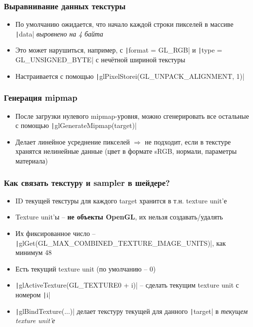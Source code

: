 \documentclass[10pt]{beamer}
\begin{document}
\begin{frame}[fragile]
\frametitle{Выравнивание данных текстуры}
\begin{itemize}
\item По умолчанию ожидается, что начало каждой строки пикселей в массиве \texttt|data| \textit{выровнено на 4 байта}
\pause
\item Это может нарушиться, например, с \texttt|format = GL_RGB| и \texttt|type = GL_UNSIGNED_BYTE| с нечётной шириной текстуры
\pause
\item Настраивается с помощью \texttt|glPixelStorei(GL_UNPACK_ALIGNMENT, 1)|
\end{itemize}
\end{frame}

\begin{frame}[fragile]
\frametitle{Генерация mipmap}
\begin{itemize}
\item После загрузки нулевого mipmap-уровня, можно сгенерировать все остальные с помощью \texttt|glGenerateMipmap(target)|
\pause
\item Делает линейное усреднение пикселей \begin{math}\Longrightarrow\end{math} не подходит, если в текстуре хранятся нелинейные данные (цвет в формате sRGB, нормали, параметры материала)
\end{itemize}
\end{frame}

\begin{frame}[fragile]
\frametitle{Как связать текстуру и sampler в шейдере?}
\begin{itemize}
\item ID текущей текстуры для каждого target хранится в т.н. texture unit'е
\item Texture unit'ы -- \textbf{не объекты OpenGL}, их нельзя создавать/удалять
\item Их фиксированное число -- \texttt|glGet(GL_MAX_COMBINED_TEXTURE_IMAGE_UNITS)|, как минимум 48
\item Есть текущий texture unit (по умолчанию -- 0)
\item \texttt|glActiveTexture(GL_TEXTURE0 + i)| -- сделать текущим texture unit с номером \texttt|i|
\item \texttt|glBindTexture(...)| делает текстуру текущей для данного \texttt|target| в \textit{текущем texture unit'е}
\end{itemize}
\end{frame}
\end{document}
